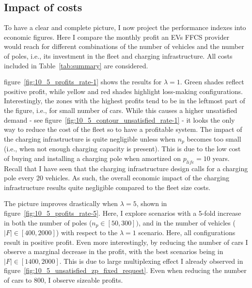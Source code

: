 \subsection{Impact of costs}







To have a clear and complete picture, I now project the performance indexes into economic figures. Here I compare the monthly profit an EVs FFCS provider would reach for different combinations of the number of vehicles and the number of poles, i.e., its investment in the fleet and charging infrastructure. All costs included in Table~\ref{tab:summary} are considered.

figure~\ref{fig:10_5_profits_rate-1} shows the results for $\lambda=1$. Green shades reflect positive profit, while yellow and red shades highlight loss-making configurations. Interestingly, the zones with the highest profits tend to be in the leftmost part of the figure, i.e., for small number of cars. While this causes a higher unsatisfied demand - see figure~\ref{fig:10_5_contour_unsatisfied_rate-1} - it looks the only way to reduce the cost of the fleet so to have a profitable system. The impact of the charging infrastructure is quite negligible unless when $n_p$ becomes too small (i.e., when not enough charging capacity is present). This is due to the low cost of buying and installing a charging pole when amortized on $p_{life}=10$ years. Recall that I have seen that the charging infrastructure design calls for a charging pole every 20 vehicles. As such, the overall economic impact of the charging infrastructure results quite negligible compared to the fleet size costs.

The picture improves drastically when $\lambda=5$, shown in figure~\ref{fig:10_5_profits_rate-5}. Here, I explore scenarios with a 5-fold increase in both the number of poles ($n_p\in[50,300])$, and in the number of vehicles ($|F|\in[400,2000]$) with respect to the $\lambda=1$ scenario. Here, all configurations result in positive profit. Even more interestingly, by reducing the number of cars I observe a marginal decrease in the profit, with the best scenarios being in $|F|\in[1400, 2000]$. This is due to large multiplexing effect I already observed in figure~\ref{fig:10_5_unsatisfied_zp_fixed_request}. Even when reducing the number of cars to 800, I observe sizeable profits.

